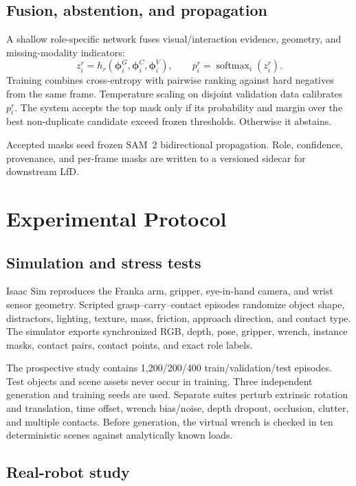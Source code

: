 \documentclass[letterpaper,10pt,journal,twoside]{IEEEtran}
\begin{document}
\subsection{Fusion, abstention, and propagation}

A shallow role-specific network fuses visual/interaction evidence, geometry,
and missing-modality indicators:
\begin{equation}
z_i^r=h_r(\boldsymbol{\phi}_i^G,\boldsymbol{\phi}_i^C,
\boldsymbol{\phi}_i^V),\qquad
p_i^r=\operatorname{softmax}_{i}(z_i^r).
\end{equation}
Training combines cross-entropy with pairwise ranking against hard negatives
from the same frame. Temperature scaling on disjoint validation data calibrates
$p_i^r$. The system accepts the top mask only if its probability and margin
over the best non-duplicate candidate exceed frozen thresholds. Otherwise it
abstains.

Accepted masks seed frozen SAM~2 bidirectional propagation. Role, confidence,
provenance, and per-frame masks are written to a versioned sidecar for
downstream LfD.

\section{Experimental Protocol}

\subsection{Simulation and stress tests}

Isaac Sim reproduces the Franka arm, gripper, eye-in-hand camera, and wrist
sensor geometry. Scripted grasp--carry--contact episodes randomize object shape,
distractors, lighting, texture, mass, friction, approach direction, and contact
type. The simulator exports synchronized RGB, depth, pose, gripper, wrench,
instance masks, contact pairs, contact points, and exact role labels.

The prospective study contains 1,200/200/400 train/validation/test episodes.
Test objects and scene assets never occur in training. Three independent
generation and training seeds are used. Separate suites perturb extrinsic
rotation and translation, time offset, wrench bias/noise, depth dropout,
occlusion, clutter, and multiple contacts. Before generation, the virtual wrench
is checked in ten deterministic scenes against analytically known loads.

\subsection{Real-robot study}
\end{document}
